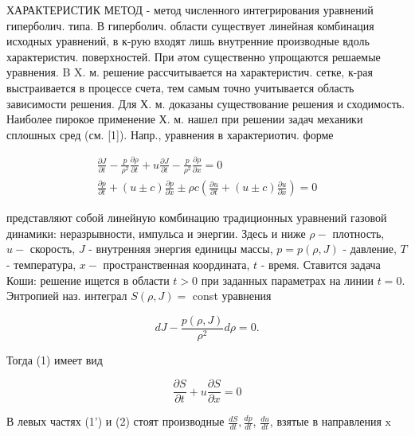 \documentclass[10pt]{article}
\begin{document}
ХАРАКТЕРИСТИК МЕТОД - метод численного интегрирования уравнений гиперболич. типа. В гиперболич. области существует линейная комбинация исходных уравнений, в к-рую входят лишь внутренние производные вдоль характеристич. поверхностей. При әтом существенно упрощаются решаемые уравнения. B X. м. решение рассчитывается на характеристич. сетке, к-рая выстраивается в процессе счета, тем самым точно учитывается область зависимости решения. Для Х. м. доказаны существование решения и сходимость. Наиболее пирокое применение Х. м. нашел при решении задач механики сплошных сред (см. [1]). Напр., уравнения в характериотич. форме



\[

\begin{gathered}

\frac{\partial J}{\partial t}-\frac{p}{\rho^{2}} \frac{\partial \rho}{\partial t}+u \frac{\partial J}{\partial t}-\frac{p}{\rho^{2}} \frac{\partial \rho}{\partial x}=0 \\

\frac{\partial p}{\partial t}+(u \pm c) \frac{\partial p}{\partial x} \pm \rho c\left(\frac{\partial u}{\partial t}+(u \pm c) \frac{\partial u}{\partial x}\right)=0

\end{gathered}

\]



представляют собой линейную комбинацию традиционных уравнений газовой динамики: неразрывности, импульса и энергии. Здесь и ниже $\rho-$ плотность, $u-$ скорость, $J$ - внутренняя энергия единицы массы, $p=p(\rho, J)$ - давление, $T$ - температура, $x-$ пространственная координата, $t$ - время. Ставится задача Коши: решение ищется в области $t>0$ при заданных параметрах на линии $t=0$. Энтропией наз. интеграл $S(\rho, J)=$ const уравнения



\[

d J-\frac{p(\rho, J)}{\rho^{2}} d \rho=0 .

\]



Тогда (1) имеет вид



\[

\frac{\partial S}{\partial t}+u \frac{\partial S}{\partial x}=0

\]



В левых частях (1') и (2) стоят производные $\frac{d S}{d t}, \frac{d p}{d t}$, $\frac{d u}{d t}$, взятые в направления $\mathrm{x}$
\end{document}
